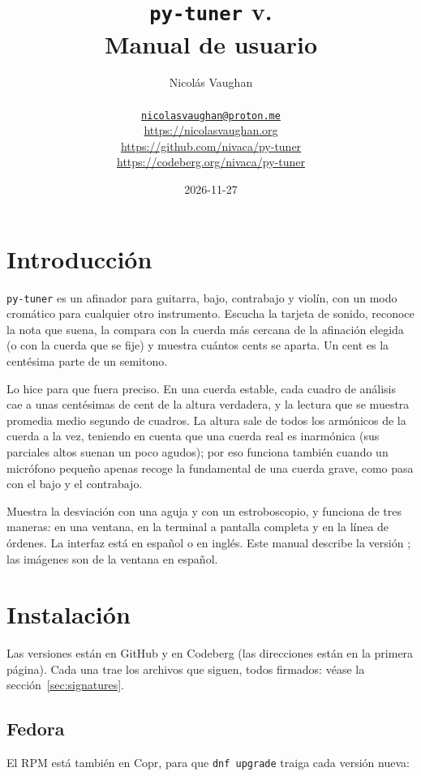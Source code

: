 \documentclass[12pt,
              article,
              oneside
              ]{memoir}
\title{\bfseries%
  \texttt{py-tuner} v.\version{} \\
  Manual de usuario}
\author{%
  Nicolás Vaughan\\
  \begin{minipage}[t]{0.8\linewidth}
    \centering\small%
    \href{mailto:nicolasvaughan@proton.me}{\texttt{nicolasvaughan@proton.me}}\\
    \url{https://nicolasvaughan.org}\\
    \url{https://github.com/nivaca/py-tuner}\\
    \url{https://codeberg.org/nivaca/py-tuner}\\
  \end{minipage}}
\date{2026-11-27}
\begin{document}
\maketitle

\tableofcontents*

\section{Introducción}
\noindent
\texttt{py-tuner} es un afinador para guitarra, bajo, contrabajo y violín,
con un modo cromático para cualquier otro instrumento. Escucha la tarjeta
de sonido, reconoce la nota que suena, la compara con la cuerda más cercana
de la afinación elegida (o con la cuerda que se fije) y muestra cuántos
cents se aparta. Un cent es la centésima parte de un semitono.

%
Lo hice para que fuera preciso. En una cuerda estable, cada cuadro de
análisis cae a unas centésimas de cent de la altura verdadera, y la lectura
que se muestra promedia medio segundo de cuadros. La altura sale de todos
los armónicos de la cuerda a la vez, teniendo en cuenta que una cuerda real
es inarmónica (sus parciales altos suenan un poco agudos); por eso funciona
también cuando un micrófono pequeño apenas recoge la fundamental de una
cuerda grave, como pasa con el bajo y el contrabajo.

%
Muestra la desviación con una aguja y con un estroboscopio, y funciona de
tres maneras: en una ventana, en la terminal a pantalla completa y en la
línea de órdenes. La interfaz está en español o en inglés. Este manual
describe la versión \version{}; las imágenes son de la ventana en español.

\section{Instalación}
\label{sec:installing}

%
Las versiones están en GitHub y en Codeberg (las direcciones están en la
primera página). Cada una trae los archivos que siguen, todos firmados:
véase la sección~\ref{sec:signatures}.

\subsection{Fedora}

%
El RPM está también en Copr, para que \texttt{dnf upgrade} traiga cada
versión nueva:
\end{document}
